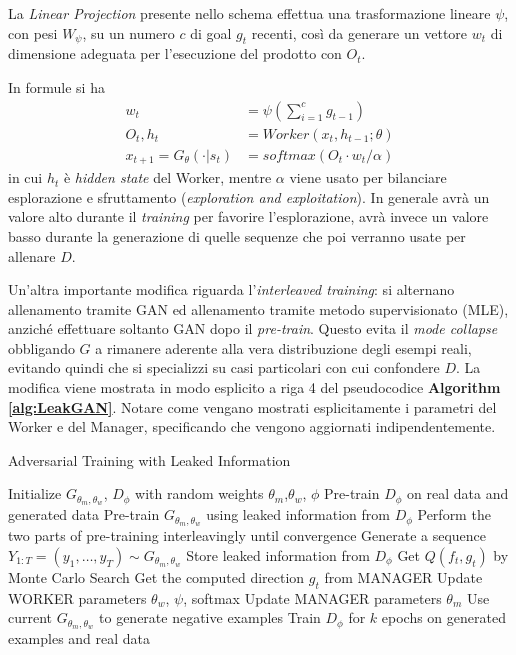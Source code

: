 La \emph{Linear Projection} presente nello schema effettua una trasformazione lineare $\psi$, con pesi $W_\psi$, su un numero $c$ di goal $g_t$ recenti, così da generare un vettore $w_t$ di dimensione adeguata per l'esecuzione del prodotto con $O_t$.

\noindent
In formule si ha
\begin{align}
  w_t &= \psi \left( \sum_{i=1}^{c} g_{t-1} \right)
  \\
  O_t, h_t &= Worker(x_t, h_{t-1}; \theta)
  \\
  x_{t+1} = G_\theta(\cdot|s_t) &= softmax ( O_t \cdot w_t / \alpha)
\end{align}
in cui $h_t$ è \emph{hidden state} del Worker, mentre $\alpha$ viene usato per bilanciare esplorazione e sfruttamento (\emph{exploration and exploitation}).
In generale avrà un valore alto durante il \emph{training} per favorire l'esplorazione, avrà invece un valore basso durante la generazione di quelle sequenze che poi verranno usate per allenare $D$.



Un'altra importante modifica riguarda l'\emph{interleaved training}: si alternano allenamento tramite GAN ed allenamento tramite metodo supervisionato (MLE), anziché effettuare soltanto GAN dopo il \emph{pre-train}.
Questo evita il \emph{mode collapse} obbligando $G$ a rimanere aderente alla vera distribuzione degli esempi reali, evitando quindi che si specializzi su casi particolari con cui confondere $D$.
La modifica viene mostrata in modo esplicito a riga 4 del pseudocodice \textbf{Algorithm \ref{alg:LeakGAN}}.
Notare come vengano mostrati esplicitamente i parametri del Worker e del Manager, specificando che vengono aggiornati indipendentemente.
\begin{algorithm}
  \caption{Adversarial Training with Leaked Information}
  \label{alg:LeakGAN}
  \begin{algorithmic}[1]
    \State Initialize $G_{\theta_m, \theta_w}$, $D_\phi$ with random weights $\theta_m$,$\theta_w$, $\phi$
    \State Pre-train $D_\phi$ on real data and generated data
    \State Pre-train $G_{\theta_m, \theta_w}$ using leaked information from $D_\phi$
    \State Perform the two parts of pre-training interleavingly until convergence
    \Repeat
        \State Generate a sequence $Y_{1:T} = (y_1, \dots, y_T) \sim G_{\theta_m, \theta_w}$
          \State Store leaked information from $D_\phi$
          \State Get $Q(f_t, g_t)$ by Monte Carlo Search
          \State Get the computed direction $g_t$ from MANAGER
          \State Update WORKER parameters $\theta_w$, $\psi$, softmax
          \State Update MANAGER parameters $\theta_m$
        \EndFor
      \EndFor
        \State Use current $G_{\theta_m, \theta_w}$ to generate negative examples
        \State Train $D_\phi$ for $k$ epochs on generated examples and real data
      \EndFor
  \end{algorithmic}
\end{algorithm}

